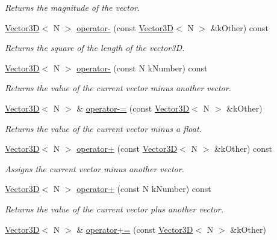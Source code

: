 \begin{DoxyCompactItemize}
\begin{DoxyCompactList}\small\item\em Returns the magnitude of the vector. \end{DoxyCompactList}\item 
\hyperlink{class_vector3_d}{Vector3\+D}$<$ N $>$ \hyperlink{class_vector3_d_ae65b3804e658444200cc8434ac929984}{operator-\/} (const \hyperlink{class_vector3_d}{Vector3\+D}$<$ N $>$ \&k\+Other) const 
\begin{DoxyCompactList}\small\item\em Returns the square of the length of the vector3\+D. \end{DoxyCompactList}\item 
\hyperlink{class_vector3_d}{Vector3\+D}$<$ N $>$ \hyperlink{class_vector3_d_a3a49109e80f54f19488ab04e2e6a793d}{operator-\/} (const N k\+Number) const 
\begin{DoxyCompactList}\small\item\em Returns the value of the current vector minus another vector. \end{DoxyCompactList}\item 
\hyperlink{class_vector3_d}{Vector3\+D}$<$ N $>$ \& \hyperlink{class_vector3_d_a176342924211b76b6d91e20e6c8edca3}{operator-\/=} (const \hyperlink{class_vector3_d}{Vector3\+D}$<$ N $>$ \&k\+Other)
\begin{DoxyCompactList}\small\item\em Returns the value of the current vector minus a float. \end{DoxyCompactList}\item 
\hyperlink{class_vector3_d}{Vector3\+D}$<$ N $>$ \hyperlink{class_vector3_d_a1ea6c7657591f53033fa520f07e424ed}{operator+} (const \hyperlink{class_vector3_d}{Vector3\+D}$<$ N $>$ \&k\+Other) const 
\begin{DoxyCompactList}\small\item\em Assigns the current vector minus another vector. \end{DoxyCompactList}\item 
\hyperlink{class_vector3_d}{Vector3\+D}$<$ N $>$ \hyperlink{class_vector3_d_a10d2178a6725fd7a198e3379f24b8079}{operator+} (const N k\+Number) const 
\begin{DoxyCompactList}\small\item\em Returns the value of the current vector plus another vector. \end{DoxyCompactList}\item 
\hyperlink{class_vector3_d}{Vector3\+D}$<$ N $>$ \& \hyperlink{class_vector3_d_ada52c0527f56d8cdee2d5824fec98a26}{operator+=} (const \hyperlink{class_vector3_d}{Vector3\+D}$<$ N $>$ \&k\+Other)

\end{DoxyCompactItemize}
